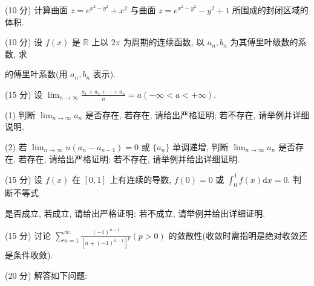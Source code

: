 (10 分) 计算曲面 $z = e^{x^2 - y^2} + x^2$ 与曲面 $z = e^{x^2 - y^2} - y^2 + 1$ 所围成的封闭区域的体积.\par
\par{}
(10 分) 设 $f(x)$ 是 $\mathbb{R}$ 上以 $2\pi$ 为周期的连续函数, 以 $a_{n}, b_{n}$ 为其傅里叶级数的系数, 求\par
\nopagebreak[4]
的傅里叶系数(用 $a_{n}, b_{n}$ 表示).\par
(15 分) 设  $\lim_{n\to\infty}\frac{a_{1}+a_{2}+\cdots+a_{n}}{n}=a(-\infty<a<+\infty).$\par
(1) 判断 $\lim_{n\to \infty}a_n$ 是否存在, 若存在, 请给出严格证明; 若不存在, 请举例并详细说明.\par
(2) 若 $\lim_{n\to \infty}n(a_n - a_{n - 1}) = 0$ 或 $\{a_n\}$ 单调递增, 判断 $\lim_{n\to \infty}a_n$ 是否存在, 若存在, 请给出严格证明; 若不存在, 请举例并给出详细证明.\par
\par{}
(15 分) 设 $f(x)$ 在 $[0,1]$ 上有连续的导数, $f(0) = 0$ 或 $\int_0^1 f(x)\mathrm{d}x = 0$. 判断不等式\par
\nopagebreak[4]
是否成立, 若成立, 请给出严格证明; 若不成立, 请举例并给出详细证明.\par
(15 分) 讨论 $\sum_{n=1}^{\infty} \frac{(-1)^{n-1}}{[n+(-1)^{n-1}]^p} (p > 0)$ 的敛散性(收敛时需指明是绝对收敛还是条件收敛).\par
(20 分) 解答如下问题:\par
